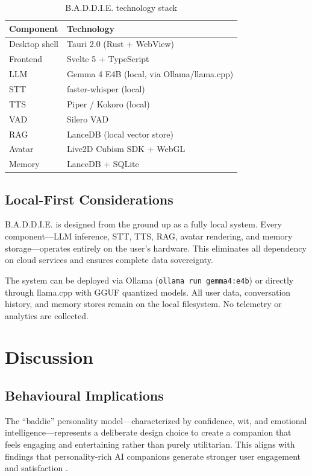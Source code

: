 \documentclass[sigconf]{acmart}
\begin{document}
\begin{table}[htbp]
    \centering
    \caption{B.A.D.D.I.E. technology stack}
    \label{tab:stack}
    \begin{tabular}{@{}ll@{}}
        \toprule
        \textbf{Component} & \textbf{Technology} \\
        \midrule
        Desktop shell & Tauri 2.0 (Rust + WebView) \\
        Frontend & Svelte 5 + TypeScript \\
        LLM & Gemma 4 E4B (local, via Ollama/llama.cpp) \\
        STT & faster-whisper (local) \\
        TTS & Piper / Kokoro (local) \\
        VAD & Silero VAD \\
        RAG & LanceDB (local vector store) \\
        Avatar & Live2D Cubism SDK + WebGL \\
        Memory & LanceDB + SQLite \\
        \bottomrule
    \end{tabular}
\end{table}

\subsection{Local-First Considerations}

B.A.D.D.I.E. is designed from the ground up as a fully local system. Every component---LLM inference, STT, TTS, RAG, avatar rendering, and memory storage---operates entirely on the user's hardware. This eliminates all dependency on cloud services and ensures complete data sovereignty.

The system can be deployed via Ollama (\texttt{ollama run gemma4:e4b}) or directly through llama.cpp with GGUF quantized models. All user data, conversation history, and memory stores remain on the local filesystem. No telemetry or analytics are collected.

\section{Discussion}

\subsection{Behavioural Implications}

The ``baddie'' personality model---characterized by confidence, wit, and emotional intelligence---represents a deliberate design choice to create a companion that feels engaging and entertaining rather than purely utilitarian. This aligns with findings that personality-rich AI companions generate stronger user engagement and satisfaction \cite{chen2024tmlr-persona}.
\end{document}
